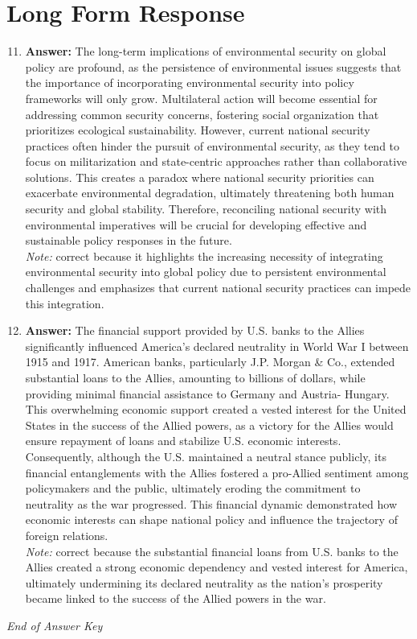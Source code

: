 \documentclass[12pt]{article}
\begin{document}
\section*{Long Form Response}
\begin{enumerate}[label=\arabic*.]
\setcounter{enumi}{10}
\item \textbf{Answer:} The long-term implications of environmental security on global policy are profound, as the persistence of environmental issues suggests that the importance of incorporating environmental security into policy frameworks will only grow. Multilateral action will become essential for addressing common security concerns, fostering social organization that prioritizes ecological sustainability. However, current national security practices often hinder the pursuit of environmental security, as they tend to focus on militarization and state-centric approaches rather than collaborative solutions. This creates a paradox where national security priorities can exacerbate environmental degradation, ultimately threatening both human security and global stability. Therefore, reconciling national security with environmental imperatives will be crucial for developing effective and sustainable policy responses in the future.
\\ \textit{Note:} correct because it highlights the increasing necessity of integrating environmental security into global policy due to persistent environmental challenges and emphasizes that current national security practices can impede this integration.
\item \textbf{Answer:} The financial support provided by U.S. banks to the Allies significantly influenced America's declared neutrality in World War I between 1915 and 1917. American banks, particularly J.P. Morgan \& Co., extended substantial loans to the Allies, amounting to billions of dollars, while providing minimal financial assistance to Germany and Austria- Hungary. This overwhelming economic support created a vested interest for the United States in the success of the Allied powers, as a victory for the Allies would ensure repayment of loans and stabilize U.S. economic interests. Consequently, although the U.S. maintained a neutral stance publicly, its financial entanglements with the Allies fostered a pro-Allied sentiment among policymakers and the public, ultimately eroding the commitment to neutrality as the war progressed. This financial dynamic demonstrated how economic interests can shape national policy and influence the trajectory of foreign relations.
\\ \textit{Note:} correct because the substantial financial loans from U.S. banks to the Allies created a strong economic dependency and vested interest for America, ultimately undermining its declared neutrality as the nation's prosperity became linked to the success of the Allied powers in the war.
\end{enumerate}

\vfill
\noindent\textit{End of Answer Key}
\end{document}
